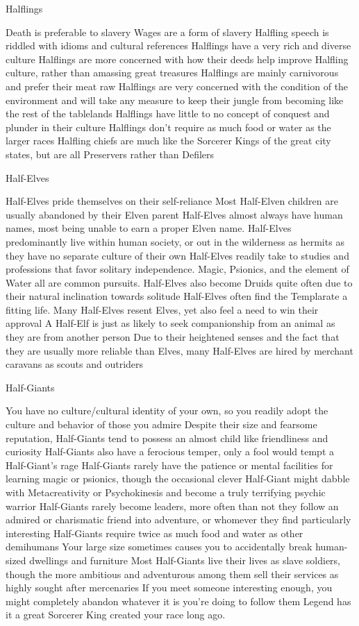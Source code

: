 Halflings

    Death is preferable to slavery
    Wages are a form of slavery
    Halfling speech is riddled with idioms and cultural references
    Halflings have a very rich and diverse culture
    Halflings are more concerned with how their deeds help improve Halfling culture, rather than amassing great treasures
    Halflings are mainly carnivorous and prefer their meat raw
    Halflings are very concerned with the condition of the environment and will take any measure to keep their jungle from becoming like the rest of the tablelands
    Halflings have little to no concept of conquest and plunder in their culture
    Halflings don’t require as much food or water as the larger races
    Halfling chiefs are much like the Sorcerer Kings of the great city states, but are all Preservers rather than Defilers

Half-Elves

    Half-Elves pride themselves on their self-reliance
    Most Half-Elven children are usually abandoned by their Elven parent
    Half-Elves almost always have human names, most being unable to earn a proper Elven name.
    Half-Elves predominantly live within human society, or out in the wilderness as hermits as they have no separate culture of their own
    Half-Elves readily take to studies and professions that favor solitary independence. Magic, Psionics, and the element of Water all are common pursuits.
    Half-Elves also become Druids quite often due to their natural inclination towards solitude
    Half-Elves often find the Templarate a fitting life.
    Many Half-Elves resent Elves, yet also feel a need to win their approval
    A Half-Elf is just as likely to seek companionship from an animal as they are from another person
    Due to their heightened senses and the fact that they are usually more reliable than Elves, many Half-Elves are hired by merchant caravans as scouts and outriders

Half-Giants

    You have no culture/cultural identity of your own, so you readily adopt the culture and behavior of those you admire
    Despite their size and fearsome reputation, Half-Giants tend to possess an almost child like friendliness and curiosity
    Half-Giants also have a ferocious temper, only a fool would tempt a Half-Giant’s rage
    Half-Giants rarely have the patience or mental facilities for learning magic or psionics, though the occasional clever Half-Giant might dabble with Metacreativity or Psychokinesis and become a truly terrifying psychic warrior
    Half-Giants rarely become leaders, more often than not they follow an admired or charismatic friend into adventure, or whomever they find particularly interesting
    Half-Giants require twice as much food and water as other demihumans
    Your large size sometimes causes you to accidentally break human-sized dwellings and furniture
    Most Half-Giants live their lives as slave soldiers, though the more ambitious and adventurous among them sell their services as highly sought after mercenaries
    If you meet someone interesting enough, you might completely abandon whatever it is you’re doing to follow them
    Legend has it a great Sorcerer King created your race long ago.

